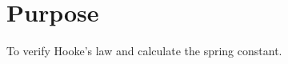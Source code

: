 \begingroup
\let\clearpage\relax\chapter{Purpose}

\indent To verify Hooke's law and calculate the spring constant.


